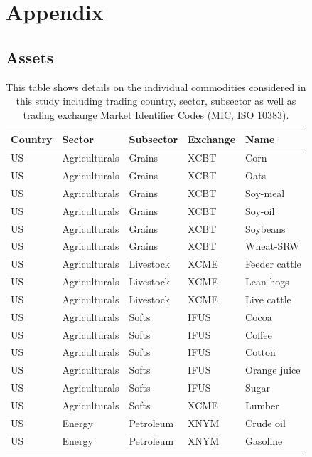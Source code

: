 \documentclass[12pt,]{article}
\begin{document}
\hypertarget{appendix}{%
\section{Appendix}\label{appendix}}

\hypertarget{assets}{%
\subsection{Assets}\label{assets}}

\begingroup\fontsize{10}{12}\selectfont

\begin{longtabu} to 
\caption{\label{tab:`appendix - assets`}This table shows details on the individual commodities considered in this study including trading country, sector, subsector as well as trading exchange Market Identifier Codes (MIC, ISO 10383).}\\
\toprule
Country & Sector & Subsector & Exchange & Name\\
\midrule
US & Agriculturals & Grains & XCBT & Corn\\
US & Agriculturals & Grains & XCBT & Oats\\
US & Agriculturals & Grains & XCBT & Soy-meal\\
US & Agriculturals & Grains & XCBT & Soy-oil\\
US & Agriculturals & Grains & XCBT & Soybeans\\
US & Agriculturals & Grains & XCBT & Wheat-SRW\\
US & Agriculturals & Livestock & XCME & Feeder cattle\\
US & Agriculturals & Livestock & XCME & Lean hogs\\
US & Agriculturals & Livestock & XCME & Live cattle\\
US & Agriculturals & Softs & IFUS & Cocoa\\
US & Agriculturals & Softs & IFUS & Coffee\\
US & Agriculturals & Softs & IFUS & Cotton\\
US & Agriculturals & Softs & IFUS & Orange juice\\
US & Agriculturals & Softs & IFUS & Sugar\\
US & Agriculturals & Softs & XCME & Lumber\\
US & Energy & Petroleum & XNYM & Crude oil\\
US & Energy & Petroleum & XNYM & Gasoline\\

\end{longtabu}
\end{document}
